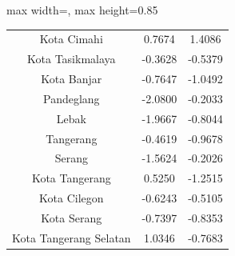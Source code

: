 \begin{table}[H]
\begin{adjustbox}{max width=\textwidth, max height=0.85\textheight}
\begin{tabular}{|c|c|c|}
Kota Cimahi & 0.7674 & 1.4086 \\
Kota Tasikmalaya & -0.3628 & -0.5379 \\
Kota Banjar & -0.7647 & -1.0492 \\
Pandeglang & -2.0800 & -0.2033 \\
Lebak & -1.9667 & -0.8044 \\
Tangerang & -0.4619 & -0.9678 \\
Serang & -1.5624 & -0.2026 \\
Kota Tangerang & 0.5250 & -1.2515 \\
Kota Cilegon & -0.6243 & -0.5105 \\
Kota Serang & -0.7397 & -0.8353 \\
Kota Tangerang Selatan & 1.0346 & -0.7683 \\
\hline
\end{tabular}
\end{adjustbox}
\end{table}